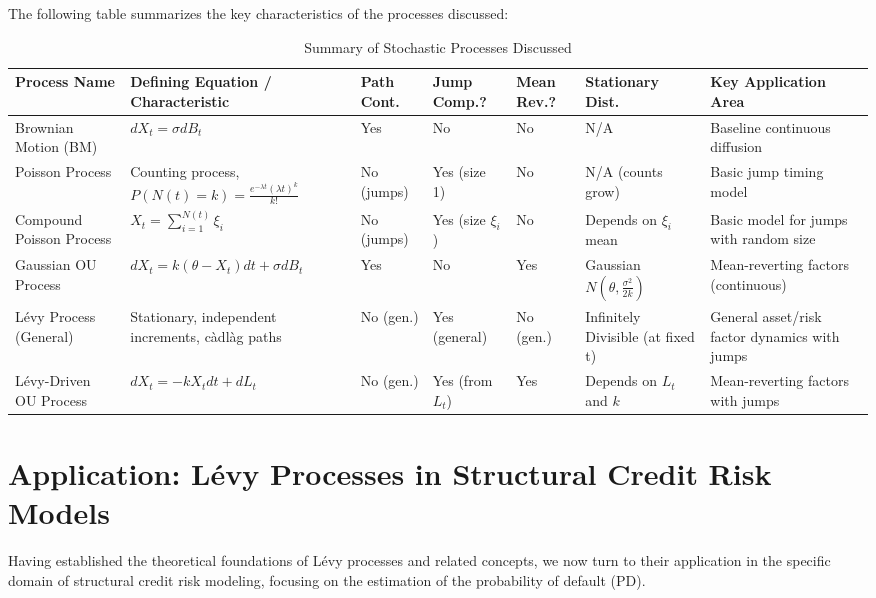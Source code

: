 \documentclass[11pt,twoside,openright]{report}
\begin{document}
The following table summarizes the key characteristics of the processes discussed:

\begin{table}[h!]
\scriptsize %
\centering
\caption{Summary of Stochastic Processes Discussed}
\label{tab:process_summary}
\begin{tabular}{@{}p{2.0cm}p{3.0cm}p{1.0cm}p{1.0cm}p{1.0cm}p{2.0cm}p{2.5cm}@{}}
\toprule
Process Name & Defining Equation / Characteristic & Path Cont. & Jump Comp.? & Mean Rev.? & Stationary Dist. & Key Application Area \\
\midrule
Brownian Motion (BM) & $dX_t = \sigma dB_t$ & Yes & No & No & N/A & Baseline continuous diffusion \\
Poisson Process & Counting process, $P(N(t)=k)=\frac{e^{-\lambda t}(\lambda t)^k}{k!}$ & No (jumps) & Yes (size 1) & No & N/A (counts grow) & Basic jump timing model \\
Compound Poisson Process & $X_t = \sum_{i=1}^{N(t)} \xi_i$ & No (jumps) & Yes (size $\xi_i$) & No & Depends on $\xi_i$ mean & Basic model for jumps with random size \\
Gaussian OU Process & $dX_t = k(\theta-X_t)dt + \sigma dB_t$ & Yes & No & Yes & Gaussian $N(\theta,\frac{\sigma^2}{2k})$ & Mean-reverting factors (continuous) \\
Lévy Process (General) & Stationary, independent increments, càdlàg paths & No (gen.) & Yes (general) & No (gen.) & Infinitely Divisible (at fixed t) & General asset/risk factor dynamics with jumps \\
Lévy-Driven OU Process & $dX_t = -k X_t dt + dL_t$ & No (gen.) & Yes (from $L_t$) & Yes & Depends on $L_t$ and $k$ & Mean-reverting factors with jumps \\
\bottomrule
\end{tabular}
\end{table}




\section{Application: Lévy Processes in Structural Credit Risk Models}
\label{sec:application_structural}

Having established the theoretical foundations of Lévy processes and related concepts, we now turn to their application in the specific domain of structural credit risk modeling, focusing on the estimation of the probability of default (PD).
\end{document}
